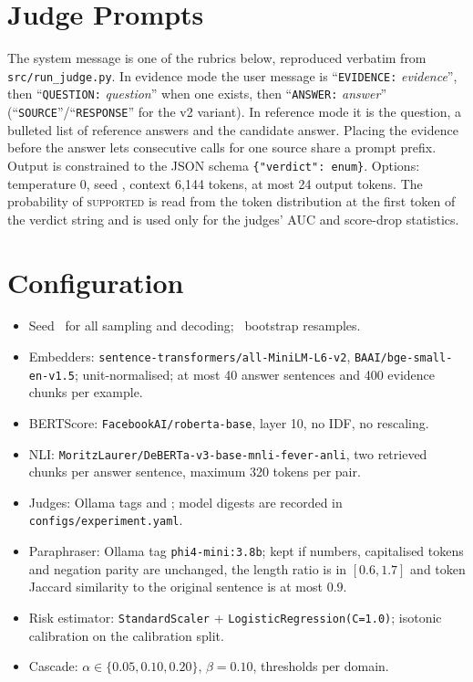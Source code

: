 \section{Judge Prompts}
\label{app:prompts}

The system message is one of the rubrics below, reproduced verbatim from \texttt{src/run\_judge.py}. In evidence mode the user message is ``\texttt{EVIDENCE:} \emph{evidence}'', then ``\texttt{QUESTION:} \emph{question}'' when one exists, then ``\texttt{ANSWER:} \emph{answer}'' (``\texttt{SOURCE}''/``\texttt{RESPONSE}'' for the v2 variant). In reference mode it is the question, a bulleted list of reference answers and the candidate answer. Placing the evidence before the answer lets consecutive calls for one source share a prompt prefix. Output is constrained to the JSON schema \texttt{\{"verdict": enum\}}. Options: temperature 0, seed \Seed, context 6{,}144 tokens, at most 24 output tokens. The probability of \textsc{supported} is read from the token distribution at the first token of the verdict string and is used only for the judges' AUC and score-drop statistics.



\section{Configuration}
\label{app:config}

\begin{itemize}\setlength{\itemsep}{0pt}
\item Seed \Seed\ for all sampling and decoding; \NBoot\ bootstrap resamples.
\item Embedders: \nolinkurl{sentence-transformers/all-MiniLM-L6-v2}, \nolinkurl{BAAI/bge-small-en-v1.5}; unit-normalised; at most 40 answer sentences and 400 evidence chunks per example.
\item BERTScore: \nolinkurl{FacebookAI/roberta-base}, layer 10, no IDF, no rescaling.
\item NLI: \nolinkurl{MoritzLaurer/DeBERTa-v3-base-mnli-fever-anli}, two retrieved chunks per answer sentence, maximum 320 tokens per pair.
\item Judges: Ollama tags \texttt{\JudgeSmallModel} and \texttt{\JudgeStrongModel}; model digests are recorded in \texttt{configs/experiment.yaml}.
\item Paraphraser: Ollama tag \texttt{phi4-mini:3.8b}; kept if numbers, capitalised tokens and negation parity are unchanged, the length ratio is in $[0.6,1.7]$ and token Jaccard similarity to the original sentence is at most $0.9$.
\item Risk estimator: \texttt{StandardScaler} + \texttt{LogisticRegression(C=1.0)}; isotonic calibration on the calibration split.
\item Cascade: $\alpha\in\{0.05,0.10,0.20\}$, $\beta=0.10$, thresholds per domain.
\end{itemize}


